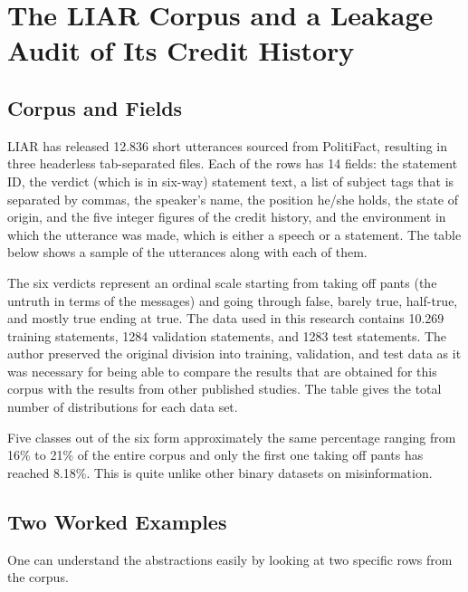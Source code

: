 \section{The LIAR Corpus and a Leakage Audit of Its Credit History}

\subsection{Corpus and Fields}

LIAR \cite{wang2017liar} has released 12.836 short utterances sourced from PolitiFact, resulting in three headerless tab-separated files. Each of the rows has 14 fields: the statement ID, the verdict (which is in six-way) statement text, a list of subject tags that is separated by commas, the speaker's name, the position he/she holds, the state of origin, and the five integer figures of the credit history, and the environment in which the utterance was made, which is either a speech or a statement. The table below shows a sample of the utterances along with each of them.



The six verdicts represent an ordinal scale starting from taking off pants (the untruth in terms of the messages) and going through false, barely true, half-true, and mostly true ending at true. The data used in this research contains 10.269 training statements, 1284 validation statements, and 1283 test statements. The author preserved the original division into training, validation, and test data as it was necessary for being able to compare the results that are obtained for this corpus with the results from other published studies. The table gives the total number of distributions for each data set.



Five classes out of the six form approximately the same percentage ranging from 16\% to 21\% of the entire corpus and only the first one taking off pants has reached 8.18\%. This is quite unlike other binary datasets on misinformation.



\subsection{Two Worked Examples}

One can understand the abstractions easily by looking at two specific rows from the corpus.

